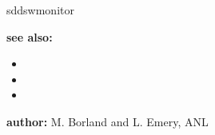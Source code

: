 \begin{sddsprog}{sddswmonitor}
\item \textbf{see also:}
\begin{itemize}
  \item {}
  \item {}
  \item {}
\end{itemize}
\item \textbf{author:} M. Borland and L. Emery, ANL
\end{sddsprog}
